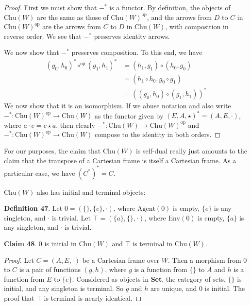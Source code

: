 \documentclass{article}
\begin{document}
\begin{proof}
First we must show that $-^*$ is a functor.
By definition, the objects of $\text{Chu}(W)$ are the same as those of $\text{Chu}(W)^{\text{op}}$, and the arrows from $D$ to $C$ in $\text{Chu}(W)^{\text{op}}$ are the arrows from $C$ to $D$ in $\text{Chu}(W)$, with composition in reverse order.
We see that $-^*$ preserves identity arrows.

We now show that $-^*$ preserves composition.
To this end, we have
\begin{displaymath}
\begin{split}
    (g_0, h_0)^* \circ^{\text{op}} (g_1, h_1)^* & = (h_1, g_1) \circ (h_0, g_0) \\
                                                & = (h_1 \circ h_0, g_0 \circ g_1) \\
                                                & = ((g_0, h_0) \circ (g_1, h_1))^*
\end{split}
\end{displaymath}
We now show that it is an isomorphism.
If we abuse notation and also write $-^* : \text{Chu}(W)^{\text{op}} \to \text{Chu}(W)$ as the functor given by $(E, A, \star)^* = (A, E, \cdot)$, where $a \cdot e = e \star a$, then clearly $-^* : \text{Chu}(W) \to \text{Chu}(W)^{\text{op}}$ and $-^* : \text{Chu}(W)^{\text{op}} \to \text{Chu}(W)$ compose to the identity in both orders.
\end{proof}

\noindent For our purposes, the claim that $\text{Chu}(W)$ is self-dual really just amounts to the claim that the transpose of a Cartesian frame is itself a Cartesian frame.
As a particular case, we have $(C^*)^* = C$.

$\text{Chu}(W)$ also has initial and terminal objects:

\bigskip
\noindent \textbf{Definition 47}.
Let $0 = (\{\}, \{e\}, \cdot)$, where $\text{Agent}(0)$ is empty, $\{e\}$ is any singleton, and $\cdot$ is trivial.
Let $\top = (\{a\}, \{\}, \cdot)$, where $\text{Env}(0)$ is empty, $\{a\}$ is any singleton, and $\cdot$ is trivial.

\bigskip
\noindent \textbf{Claim 48}.
$0$ is initial in $\text{Chu}(W)$ and $\top$ is terminal in $\text{Chu}(W)$.

\begin{proof}
Let $C = (A, E, \cdot)$ be a Cartesian frame over $W$.
Then a morphism from $0$ to $C$ is a pair of functions $(g, h)$, where $g$ is a function from $\{\}$ to $A$ and $h$ is a function from $E$ to $\{e\}$.
Considered as objects in \textbf{Set}, the category of sets, $\{\}$ is initial, and any singleton is terminal.
So $g$ and $h$ are unique, and $0$ is initial.
The proof that $\top$ is terminal is nearly identical.
\end{proof}
\end{document}
